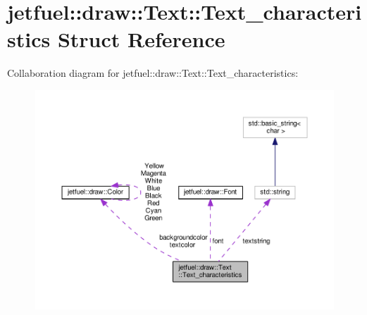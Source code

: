 \hypertarget{structjetfuel_1_1draw_1_1Text_1_1Text__characteristics}{}\section{jetfuel\+:\+:draw\+:\+:Text\+:\+:Text\+\_\+characteristics Struct Reference}
\label{structjetfuel_1_1draw_1_1Text_1_1Text__characteristics}


Collaboration diagram for jetfuel\+:\+:draw\+:\+:Text\+:\+:Text\+\_\+characteristics\+:\nopagebreak
\begin{figure}[H]
\begin{center}
\leavevmode
\includegraphics[width=350pt]{structjetfuel_1_1draw_1_1Text_1_1Text__characteristics__coll__graph}
\end{center}
\end{figure}
